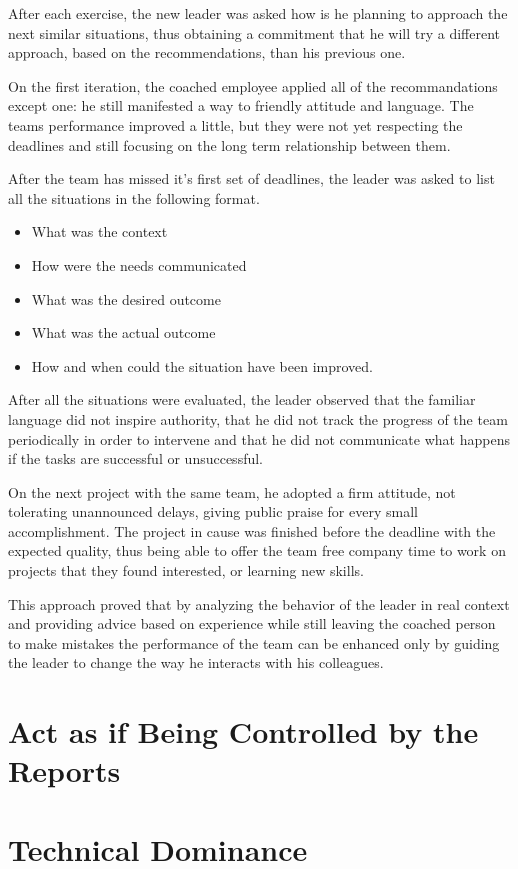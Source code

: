 After each exercise, the new leader was asked how is he planning to approach the next similar situations, thus obtaining a commitment that he will try a different approach, based on the recommendations,  than his previous one.

On the first iteration, the coached employee applied all of the recommandations except one: he still manifested a way to friendly attitude and language. The teams performance improved a little, but they were not yet respecting the deadlines and still focusing on the long term relationship between them. 

After the team has missed it's first set of deadlines, the leader was asked to list all the situations in the following format.
\begin{itemize}
\item What was the context
\item How were the needs communicated 
\item What was the desired outcome
\item What was the actual outcome
\item How and when could the situation have been improved.
\end{itemize}

After all the situations were evaluated, the leader observed that 
the familiar language did not inspire authority, that he did not track the progress of the team periodically in order to intervene and that he did not communicate what happens if the tasks are successful or unsuccessful.

On the next project with the same team, he adopted a firm attitude, not tolerating unannounced delays, giving public praise for every small accomplishment. The project in cause was finished before the deadline with the expected quality, thus being able to offer the team free company time to work on projects that they found interested, or learning new skills.

This approach proved that by analyzing the behavior of the leader in real context and providing advice based on experience while still leaving the coached person to make mistakes the performance of the team can be enhanced only by guiding the leader to change the way he interacts with his colleagues.
\section{Act as if Being Controlled by the Reports}
\label{sec:under-control}

\section{Technical Dominance}
\label{sec:tech-dom}
